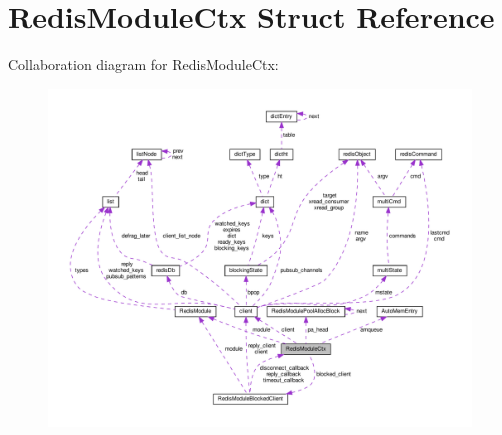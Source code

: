 \hypertarget{struct_redis_module_ctx}{}\section{Redis\+Module\+Ctx Struct Reference}
\label{struct_redis_module_ctx}


Collaboration diagram for Redis\+Module\+Ctx\+:
\nopagebreak
\begin{figure}[H]
\begin{center}
\leavevmode
\includegraphics[width=350pt]{struct_redis_module_ctx__coll__graph}
\end{center}
\end{figure}
